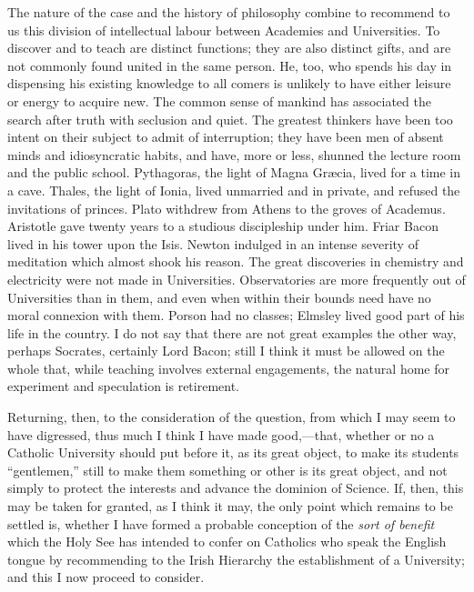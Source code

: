 The nature of the case and the history of philosophy combine to
recommend to us this division of intellectual labour between Academies
and Universities. To discover and to teach are distinct functions; they
are also distinct gifts, and are not commonly found united in the same
person. He, too, who spends his day in dispensing his existing knowledge
to all comers is unlikely to have either leisure or energy to acquire
new. The common sense of mankind has associated the search after truth
with seclusion and quiet. The greatest thinkers have been too intent on
their subject to admit of interruption; they have been men of absent
minds and idiosyncratic habits, and have, more or less, shunned the
lecture room and the public school. Pythagoras, the light of Magna
Græcia, lived for a time in a cave. Thales, the light of Ionia, lived
unmarried and in private, and refused the invitations of princes. Plato
withdrew from Athens to the groves of Academus. Aristotle gave twenty
years to a studious discipleship under him. Friar Bacon lived in his
tower upon the Isis. Newton indulged in an intense severity of
meditation which almost shook his reason. The great discoveries in
chemistry and electricity were not made in Universities. Observatories
are more frequently out of Universities than in them, and even when
within their bounds need have no moral connexion with them. Porson had
no classes; Elmsley lived good part of his life in the country. I do not
say that there are not great examples the other way, perhaps Socrates,
certainly Lord Bacon; still I think it must be allowed on the whole
that, while teaching involves external engagements, the natural home for
experiment and speculation is retirement.

Returning, then, to the consideration of the question, from which I
may seem to have digressed, thus much I think I have made good,—that,
whether or no a Catholic University should put before it, as its great
object, to make its students ``gentlemen,'' still to make them
something or other is its great object, and not simply to protect the
interests and advance the dominion of Science. If, then, this may be
taken for granted, as I think it may, the only point which remains to be
settled is, whether I have formed a probable conception of the \emph{sort
of benefit} which the Holy See has intended to confer on Catholics
who speak the English tongue by recommending to the Irish Hierarchy the
establishment of a University; and this I now proceed to consider.

